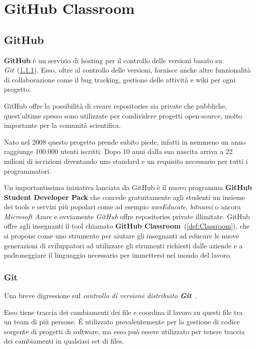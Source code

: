
\chapter{GitHub Classroom}
	\section{GitHub}\label{def:GitHub}
		\textbf{GitHub} è un servizio di hosting per il controllo delle versioni basato su \textit{Git}~(\ref{def:Git}).
		Esso, oltre al controllo delle versioni, fornisce anche altre funzionalità di collaborazione come il bug tracking, gestione delle attività e wiki per ogni progetto.
		
		GitHub offre la possibilità di creare repositories sia private che pubbliche, quest'ultime spesso sono utilizzate per condividere progetti open-source, molto importante per la comunità scientifica.
		
		Nato nel 2008 questo progetto prende subito piede, infatti in nemmeno un anno raggiunge 100.000 utenti iscritti. Dopo 10 anni dalla sua nascita arriva a 22 milioni di iscrizioni diventando uno standard  e un requisito necessario per tutti i programmatori.
		
		Un importantissima iniziativa lanciata da GitHub è il nuovo programma \textbf{GitHub Student Developer Pack} che concede gratuitamente agli studenti un insieme dei tools e servizi più popolari come ad esempio \textit{awsEducate}, \textit{bitnami} o ancora \textit{Microsoft Azure} e ovviamente \textit{GitHub} offre repositories private illimitate.
		GitHub offre agli insegnanti il tool chiamato \textbf{GitHub Classroom}~(\ref{def:Classroom}), che si propone come uno strumento per aiutare gli insegnanti ad  educare le nuove generazioni di sviluppatori ad utilizzare gli strumenti richiesti dalle aziende e a padroneggiare il linguaggio necessario per immettersi nel mondo del lavoro.
	
		\subsection{Git}\label{def:Git}
			Una breve digressione sul \textit{controllo di versione distribuito \textbf{Git}}~\citep{ProGit2018}.
			
			Esso tiene traccia dei cambiamenti dei file e coordina il lavoro su questi file tra un team di più persone.
			\'E utilizzato prevalentemente per la gestione di codice sorgente di progetti di software, ma esso può essere utilizzato per tenere traccia dei cambiamenti in  qualsiasi set di files.
			
